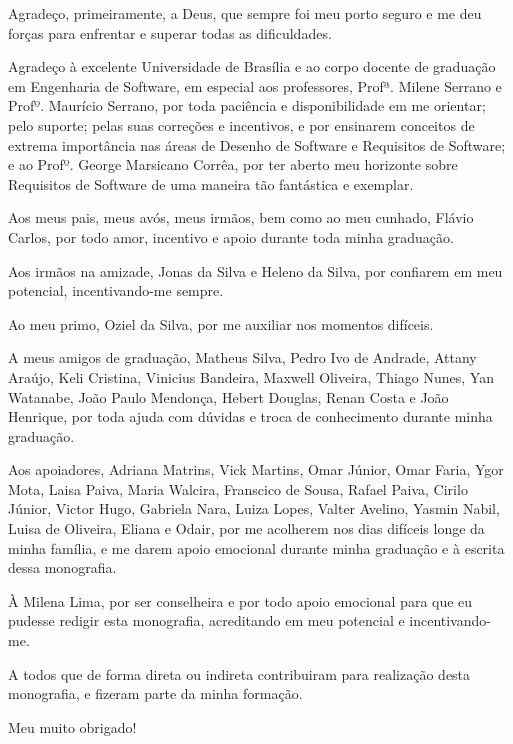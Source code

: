 \begin{agradecimentos}

	Agradeço, primeiramente, a Deus, que sempre foi meu porto seguro e me deu forças para enfrentar e superar todas as dificuldades.
	 
	Agradeço à excelente Universidade de Brasília e ao corpo docente de graduação em Engenharia de Software, em especial aos professores, Profª. Milene Serrano e Profº. Maurício Serrano, por toda paciência e disponibilidade em me orientar; pelo suporte; pelas suas correções e incentivos, e por ensinarem conceitos de extrema importância nas áreas de Desenho de Software e Requisitos de Software; e ao Profº. George Marsicano Corrêa, por ter aberto meu horizonte sobre Requisitos de Software de uma maneira tão fantástica e exemplar.
	
	Aos meus pais, meus avós, meus irmãos, bem como ao meu cunhado, Flávio Carlos, por todo amor, incentivo e apoio durante toda minha graduação. 
	
	Aos irmãos na amizade, Jonas da Silva e Heleno da Silva, por confiarem em meu potencial, incentivando-me sempre. 
	
	Ao meu primo, Oziel da Silva, por me auxiliar nos momentos difíceis. 
	
	A meus amigos de graduação, Matheus Silva, Pedro Ivo de Andrade, Attany Araújo, Keli Cristina, Vinicius Bandeira, Maxwell Oliveira, Thiago Nunes, Yan Watanabe, João Paulo Mendonça, Hebert Douglas, Renan Costa e João Henrique, por toda ajuda com dúvidas e troca de conhecimento durante minha graduação. 
	
	Aos apoiadores, Adriana Matrins, Vick Martins, Omar Júnior, Omar Faria, Ygor Mota, Laisa Paiva, Maria Walcira, Franscico de Sousa, Rafael Paiva, Cirilo Júnior, Victor Hugo, Gabriela Nara, Luiza Lopes, Valter Avelino, Yasmin Nabil, Luisa de Oliveira, Eliana e Odair,  por me acolherem nos dias difíceis longe da minha família,  e me darem apoio emocional durante minha graduação e à escrita dessa monografia. 
	
	À Milena Lima, por ser conselheira e por todo apoio emocional para que eu pudesse redigir esta monografia, acreditando em meu potencial e incentivando-me.
	
	A todos que de forma direta ou indireta contribuiram para realização desta monografia, e fizeram parte da minha formação. 
	
	Meu muito obrigado!  
	
\end{agradecimentos}
